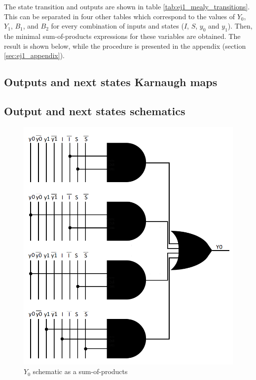 \documentclass[../../e3_tp3_main.tex]{subfiles}
\begin{document}
The state transition and outputs are shown in table \ref{tab:ej1_mealy_transitions}. This can be separated in four other tables which correspond to the values of $Y_0$, $Y_1$, $B_1$, and $B_2$ for every combination of inputs and states ($I$, $S$, $y_0$ and $y_1$). Then, the minimal sum-of-products expressions for these variables are obtained. The result is shown below, while the procedure is presented in the appendix (section \ref{sec:ej1_appendix}). 

\subsection{Outputs and next states Karnaugh maps}


\subsection{Output and next states schematics}
\begin{figure}[H]
	\centering
	\includegraphics{figures/mealy_Y0_schem.PNG}
	\caption{$Y_0$ schematic as a sum-of-products}
	\label{fig:ej1_mealy_Y0_schem}
\end{figure}
\end{document}
